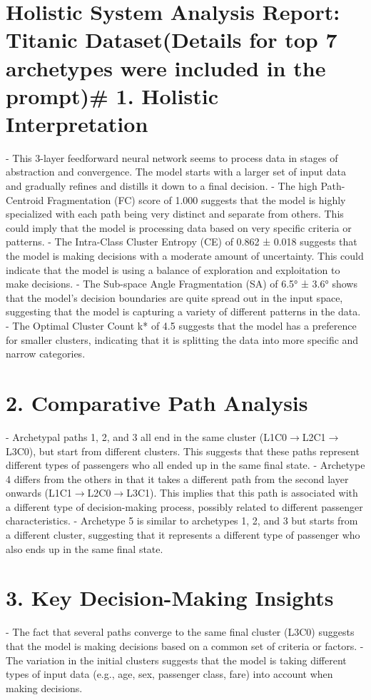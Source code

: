 \section*{Holistic System Analysis Report: Titanic Dataset\n(Details for top 7 archetypes were included in the prompt)\n\n# 1. Holistic Interpretation}
- This 3-layer feedforward neural network seems to process data in stages of abstraction and convergence. The model starts with a larger set of input data and gradually refines and distills it down to a final decision.
- The high Path-Centroid Fragmentation (FC) score of 1.000 suggests that the model is highly specialized with each path being very distinct and separate from others. This could imply that the model is processing data based on very specific criteria or patterns.
- The Intra-Class Cluster Entropy (CE) of 0.862 ± 0.018 suggests that the model is making decisions with a moderate amount of uncertainty. This could indicate that the model is using a balance of exploration and exploitation to make decisions.
- The Sub-space Angle Fragmentation (SA) of 6.5° ± 3.6° shows that the model's decision boundaries are quite spread out in the input space, suggesting that the model is capturing a variety of different patterns in the data.
- The Optimal Cluster Count k* of 4.5 suggests that the model has a preference for smaller clusters, indicating that it is splitting the data into more specific and narrow categories.

\section*{2. Comparative Path Analysis}
- Archetypal paths 1, 2, and 3 all end in the same cluster (L1C0$\rightarrow$L2C1$\rightarrow$L3C0), but start from different clusters. This suggests that these paths represent different types of passengers who all ended up in the same final state.
- Archetype 4 differs from the others in that it takes a different path from the second layer onwards (L1C1$\rightarrow$L2C0$\rightarrow$L3C1). This implies that this path is associated with a different type of decision-making process, possibly related to different passenger characteristics.
- Archetype 5 is similar to archetypes 1, 2, and 3 but starts from a different cluster, suggesting that it represents a different type of passenger who also ends up in the same final state.

\section*{3. Key Decision-Making Insights}
- The fact that several paths converge to the same final cluster (L3C0) suggests that the model is making decisions based on a common set of criteria or factors.
- The variation in the initial clusters suggests that the model is taking different types of input data (e.g., age, sex, passenger class, fare) into account when making decisions.

